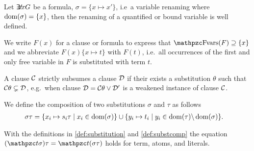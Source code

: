 \begin{definition}
	Let $\quantify x G$ be a formula, $\sigma = \{ x\mapsto x'\}$, i.e~a variable renaming where $\operatorname{dom}(\sigma) = \{ x \}$, 
	then the renaming of a quantified or bound variable is well defined.
	
\end{definition}



\begin{remark}[\OBSOLETE] 
	We write $F(x)$ for a clause or formula to express that $\fvar(F) \supseteq \{ x \}$
	and we abbreviate $F(x)\{x\mapsto t\}$ with $F(t)$, i.e.~all occurrences 
	of the first and only free variable in $F$ is substituted with term $t$.
\end{remark}




\begin{definition}
	A clause ${\mathcal C}$ {\myem strictly subsumes} a clause ${\mathcal D}$ if their exists a substitution $\theta$ such that ${\mathcal C}\theta \subsetneq {\mathcal D}$,
	e.g.~when clause ${\mathcal D} = {\mathcal C}\theta \lor {\mathcal D}'$ is a weakened instance of clause ${\mathcal C}$.
\end{definition}

\begin{definition}\label{def:substcomp}
We define the {\myem composition} of two substitutions $\sigma$ and $\tau$ as follows
	\begin{align*}
		\sigma\tau&=\{ x_i\mapsto s_i\tau\mid x_i\in\operatorname{dom}(\sigma) \}
		\cup
		\{ y_i\mapsto t_i\mid y_i\in\operatorname{dom}(\tau) \backslash \operatorname{dom}(\sigma) \}.
	\end{align*}
\end{definition}

\begin{lemma}\label{lem:substitution}
	With the definitions in \ref{def:substitution} and \ref{def:substcomp} the equation
	$(\mct\sigma)\tau = \mct(\sigma\tau)$ holds for
	term, atoms, and literals.
\end{lemma}

